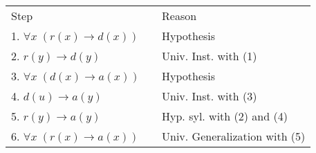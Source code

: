 \documentclass[12pt,addpoints]{exam}
\begin{document}
\begin{questions}
\begin{solution}
    \smallskip
    \begin{tabular}{lll}
        Step        & \hspace{0.2in} & Reason \\
        1. $\forall x\;(r(x) \rightarrow d(x))$     &   & Hypothesis \\
        2. $r(y) \rightarrow d(y)$                  & & Univ. Inst. with (1) \\
        3. $\forall x\; (d(x) \rightarrow a(x))$    &   & Hypothesis \\
        4. $d(u) \rightarrow a(y)$                  &   & Univ. Inst. with (3) \\
        5. $r(y) \rightarrow a(y)$                  &   & Hyp. syl. with (2) and (4) \\
        6. $\forall x\;(r(x) \rightarrow a(x))$     &   & Univ. Generalization with (5) \\
    \end{tabular}

%
    \end{solution}



\end{questions}
\end{document}
